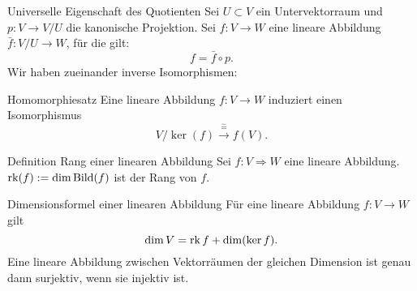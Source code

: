 \documentclass[main.tex]{subfiles}
\begin{document}
\begin{karte}{Universelle Eigenschaft des Quotienten}
    Sei \( U \subset V \) ein Untervektorraum und 
    \( p : V \rightarrow V/U \) die kanonische Projektion. 
    Sei \( f: V \rightarrow W \) eine lineare Abbildung 
    \( \bar{f} : V/U \rightarrow W \), für die gilt:
    \[ f = \bar{f} \circ p. \]
    Wir haben zueinander inverse Isomorphismen:
\end{karte}
\begin{karte}{Homomorphiesatz}
    Eine lineare Abbildung \(f: V \rightarrow W\) 
    induziert einen Isomorphismus
    \[ V/\ker(f) \xrightarrow{\overset{\sim}{=}} f(V). \]
\end{karte}
\begin{karte}{Definition Rang einer linearen Abbildung}
    Sei \(f : V \Rightarrow W\) eine lineare Abbildung. 
    \(\operatorname{rk}(f) := \dim \operatorname{Bild}(f) \) ist der Rang von \(f\).
\end{karte}
\begin{karte}{Dimensionsformel einer linearen Abbildung}
    Für eine lineare Abbildung \( f: V \rightarrow W \) 
    gilt 
    \[ \dim V = \operatorname{rk} f + \dim(\ker f). \]
    Eine lineare Abbildung zwischen Vektorräumen 
    der gleichen Dimension ist genau dann surjektiv, wenn sie 
    injektiv ist.    
\end{karte}
\end{document}
